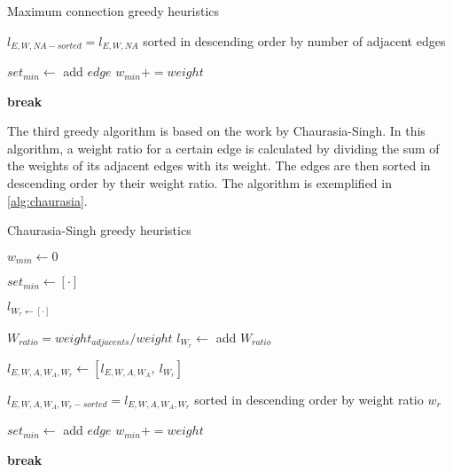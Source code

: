 \begin{algorithm}
\caption{Maximum connection greedy heuristics}
\label{alg:max-connection}
\begin{algorithmic}


\State $l_{E,W,NA-sorted} = l_{E,W,NA}$ sorted in descending order by number of adjacent edges

    \State $set_{min} \gets$ add $edge$
    \State $w_{min} += weight$

        \State \textbf{break}
    \EndIf
\EndFor
\end{algorithmic}
\end{algorithm}

The third greedy algorithm is based on the work by Chaurasia-Singh\cite{chaurasia}.
In this algorithm, a weight ratio for a certain edge is calculated by dividing the sum of the weights of its adjacent edges with its weight.
The edges are then sorted in descending order by their weight ratio.
The algorithm is exemplified in \autoref{alg:chaurasia}.

\newpage

\begin{algorithm}
\caption{Chaurasia-Singh greedy heuristics}
\label{alg:chaurasia}
\begin{algorithmic}

$w_{min} \gets 0$

$set_{min} \gets [\cdot]$

$l_{W_{r} \gets [\cdot]}$

    
    $W_{ratio} = weight_{adjacents} / weight$
    \State $l_{W_{r}} \gets$ add $W_{ratio}$

\EndFor

\State $l_{E,W,A,W_{A},W_{r}} \gets [l_{E,W,A,W_{A}},\ l_{W_{r}}]$

\State $l_{E,W,A,W_{A},W_{r}-sorted} = l_{E,W,A, W_{A}, W_{r}}$ sorted in descending order by weight ratio $w_r$

    \State $set_{min} \gets$ add $edge$
    \State $w_{min} += weight$

        \State \textbf{break}
    \EndIf
\EndFor
\end{algorithmic}
\end{algorithm}